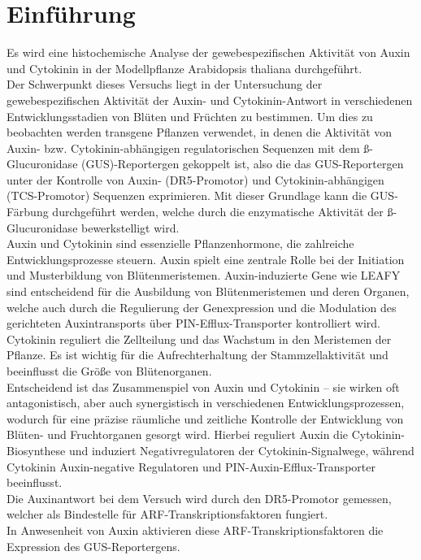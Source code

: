 \documentclass[10pt,a4paper]{article}
\begin{document}
	\section{Einführung}	
	Es wird eine histochemische Analyse der gewebespezifischen Aktivität von Auxin und Cytokinin in der Modellpflanze Arabidopsis thaliana durchgeführt. \\
	Der Schwerpunkt dieses Versuchs liegt in der Untersuchung der gewebespezifischen Aktivität der Auxin- und Cytokinin-Antwort in verschiedenen Entwicklungsstadien von Blüten und Früchten zu bestimmen. Um dies zu beobachten werden transgene Pflanzen verwendet, in denen die Aktivität von Auxin- bzw. Cytokinin-abhängigen regulatorischen Sequenzen mit dem ß-Glucuronidase (GUS)-Reportergen gekoppelt ist, also die das GUS-Reportergen unter der Kontrolle von Auxin- (DR5-Promotor) und Cytokinin-abhängigen (TCS-Promotor) Sequenzen exprimieren. Mit dieser Grundlage kann die GUS-Färbung durchgeführt werden, welche durch die enzymatische Aktivität der ß-Glucuronidase bewerkstelligt wird. \\
	Auxin und Cytokinin sind essenzielle Pflanzenhormone, die zahlreiche Entwicklungsprozesse steuern. Auxin spielt eine zentrale Rolle bei der Initiation und Musterbildung von Blütenmeristemen. Auxin-induzierte Gene wie LEAFY sind entscheidend für die Ausbildung von Blütenmeristemen und deren Organen, welche auch durch die Regulierung der Genexpression und die Modulation des gerichteten Auxintransports über PIN-Efflux-Transporter kontrolliert wird. Cytokinin reguliert die Zellteilung und das Wachstum in den Meristemen der Pflanze. Es ist wichtig für die Aufrechterhaltung der Stammzellaktivität und beeinflusst die Größe von Blütenorganen. \\
	Entscheidend ist das Zusammenspiel von Auxin und Cytokinin – sie wirken oft antagonistisch, aber auch synergistisch in verschiedenen Entwicklungsprozessen, wodurch für eine präzise räumliche und zeitliche Kontrolle der Entwicklung von Blüten- und Fruchtorganen gesorgt wird. Hierbei reguliert Auxin die Cytokinin-Biosynthese und induziert Negativregulatoren der Cytokinin-Signalwege, während Cytokinin Auxin-negative Regulatoren und PIN-Auxin-Efflux-Transporter beeinflusst. \\
	Die Auxinantwort bei dem Versuch wird durch den DR5-Promotor gemessen, welcher als Bindestelle für ARF-Transkriptionsfaktoren fungiert. \\
	In Anwesenheit von Auxin aktivieren diese ARF-Transkriptionsfaktoren die Expression des GUS-Reportergens. \\
\end{document}
